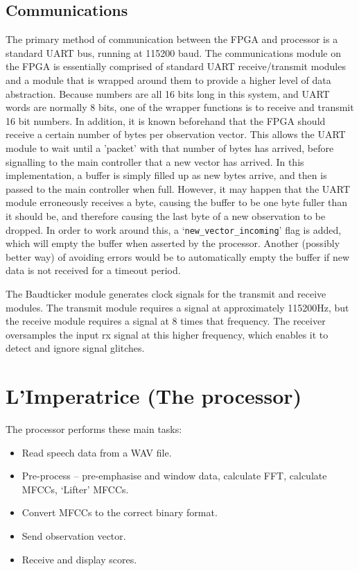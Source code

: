 	\subsection{Communications} %
	\label{sub:fpga_communications}
		The primary method of communication between the FPGA and processor is a standard UART bus, running at 115200 baud.  The communications module on the FPGA is essentially comprised of standard UART receive/transmit modules and a module that is wrapped around them to provide a higher level of data abstraction.  Because numbers are all 16 bits long in this system, and UART words are normally 8 bits, one of the wrapper functions is to receive and transmit 16 bit numbers.  In addition, it is known beforehand that the FPGA should receive a certain number of bytes per observation vector.  This allows the UART module to wait until a 'packet' with that number of bytes has arrived, before signalling to the main controller that a new vector has arrived.  In this implementation, a buffer is simply filled up as new bytes arrive, and then is passed to the main controller when full.  However, it may happen that the UART module erroneously receives a byte, causing the buffer to be one byte fuller than it should be, and therefore causing the last byte of a new observation to be dropped.  In order to work around this, a `\texttt{new\_vector\_incoming}' flag is added, which will empty the buffer when asserted by the processor.  Another (possibly better way) of avoiding errors would be to automatically empty the buffer if new data is not received for a timeout period.

		The Baudticker module generates clock signals for the transmit and receive modules.  The transmit module requires a signal at approximately 115200Hz, but the receive module requires a signal at 8 times that frequency.  The receiver oversamples the input rx signal at this higher frequency, which enables it to detect and ignore signal glitches.  %
	


\section{L'Imperatrice (The processor)} %
\label{sec:l_imperatrice_processor}

	The processor performs these main tasks:
	\begin{itemize}
		\item Read speech data from a WAV file.
		\item Pre-process -- pre-emphasise and window data, calculate FFT, calculate MFCCs, `Lifter' MFCCs.
		\item Convert MFCCs to the correct binary format.
		\item Send observation vector.
		\item Receive and display scores.
	\end{itemize}

